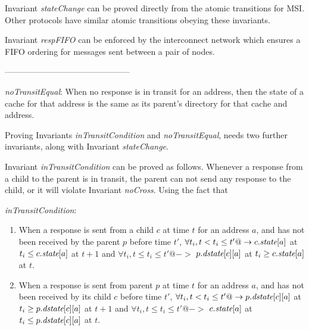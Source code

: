 Invariant \textit{stateChange} can be proved directly from the atomic
transitions for MSI. Other protocols have similar atomic transitions obeying
these invariants.

Invariant \textit{respFIFO} can be enforced by the interconnect network which
ensures a FIFO ordering for messages sent between a pair of nodes.

---------------------------------------------


\begin{inv}
\textit{noTransitEqual}: When no response is in transit for an address, then
the state of a cache for that address is the same as its parent's directory for
that cache and address.
\label{noTransitEqual}
\end{inv}

Proving Invariants \textit{inTransitCondition} and \textit{noTransitEqual},
needs two further invariants, along with Invariant \textit{stateChange}.

Invariant \textit{inTransitCondition} can be proved as follows. Whenever a
response from a child to the parent is in transit, the parent can not send any
response to the child, or it will violate Invariant \textit{noCross}. Using the fact that 







\begin{inv}
\textit{inTransitCondition}:
\begin{enumerate}
\item When a response is sent from a child $c$ at time $t$ for an address $a$,
and has not been received by the parent $p$ before time $t'$, $\forall t_i, t <
t_i \le t' @-> c.\textit{state}[a]$ at $t_i \le c.\textit{state}[a]$ at $t+1$ and $\forall t_i,
t \le t_i \le t' @->$ $p.\textit{dstate}[c][a]$ at $t_i \ge c.\textit{state}[a]$ at $t$.
\item When a response is sent from parent $p$ at time $t$ for an address $a$,
and has not been received by its child $c$ before time $t'$, $\forall t_i, t <
t_i \le t' @-> p.\textit{dstate}[c][a]$ at $t_i \ge p.\textit{dstate}[c][a]$ at $t+1$ and
$\forall t_i, t \le t_i \le t' @->$ $c.\textit{state}[a]$ at $t_i \le p.\textit{dstate}[c][a]$ at
$t$.
\end{enumerate}
\label{inTransitCondition}
\end{inv}

